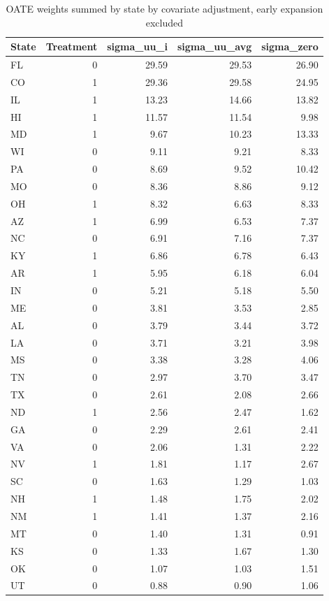 \begin{table}[ht]
\centering
\caption{OATE weights summed by state by covariate adjustment, early expansion excluded}
\label{tab:oatestateweightsc2}
\begin{tabular}{lrrrr}
  \hline
State & Treatment & sigma\_uu\_i & sigma\_uu\_avg & sigma\_zero \\ 
  \hline
FL & 0 & 29.59 & 29.53 & 26.90 \\ 
  CO & 1 & 29.36 & 29.58 & 24.95 \\ 
  IL & 1 & 13.23 & 14.66 & 13.82 \\ 
  HI & 1 & 11.57 & 11.54 & 9.98 \\ 
  MD & 1 & 9.67 & 10.23 & 13.33 \\ 
  WI & 0 & 9.11 & 9.21 & 8.33 \\ 
  PA & 0 & 8.69 & 9.52 & 10.42 \\ 
  MO & 0 & 8.36 & 8.86 & 9.12 \\ 
  OH & 1 & 8.32 & 6.63 & 8.33 \\ 
  AZ & 1 & 6.99 & 6.53 & 7.37 \\ 
  NC & 0 & 6.91 & 7.16 & 7.37 \\ 
  KY & 1 & 6.86 & 6.78 & 6.43 \\ 
  AR & 1 & 5.95 & 6.18 & 6.04 \\ 
  IN & 0 & 5.21 & 5.18 & 5.50 \\ 
  ME & 0 & 3.81 & 3.53 & 2.85 \\ 
  AL & 0 & 3.79 & 3.44 & 3.72 \\ 
  LA & 0 & 3.71 & 3.21 & 3.98 \\ 
  MS & 0 & 3.38 & 3.28 & 4.06 \\ 
  TN & 0 & 2.97 & 3.70 & 3.47 \\ 
  TX & 0 & 2.61 & 2.08 & 2.66 \\ 
  ND & 1 & 2.56 & 2.47 & 1.62 \\ 
  GA & 0 & 2.29 & 2.61 & 2.41 \\ 
  VA & 0 & 2.06 & 1.31 & 2.22 \\ 
  NV & 1 & 1.81 & 1.17 & 2.67 \\ 
  SC & 0 & 1.63 & 1.29 & 1.03 \\ 
  NH & 1 & 1.48 & 1.75 & 2.02 \\ 
  NM & 1 & 1.41 & 1.37 & 2.16 \\ 
  MT & 0 & 1.40 & 1.31 & 0.91 \\ 
  KS & 0 & 1.33 & 1.67 & 1.30 \\ 
  OK & 0 & 1.07 & 1.03 & 1.51 \\ 
  UT & 0 & 0.88 & 0.90 & 1.06 \\ 
   \hline
\end{tabular}
\end{table}
